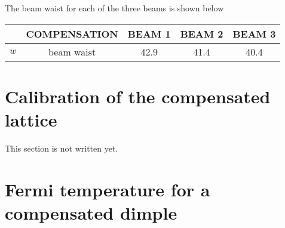 \documentclass[11pt,letter]{article}
\newcommand{\pin}{\ensuremath{ P_{\text{i}}} }
\newcommand{\win}{\ensuremath{ w_{\text{in}}} }
\newcommand{\wret}{\ensuremath{ w_{\text{r}}} }
\begin{document}
The beam waist for each of the three beams is shown below
\begin{center}
\begin{tabular}{c|c|c|c|c}
      &  COMPENSATION & BEAM 1 & BEAM 2 & BEAM 3   \\ \hline \hline 
  $w  $ &  beam waist  & 42.9 & 41.4 & 40.4 \\
\end{tabular}
\end{center}



\section{Calibration of the compensated lattice} 

This section is not written yet. 

%

\section{Fermi temperature for a compensated dimple}
\end{document}
